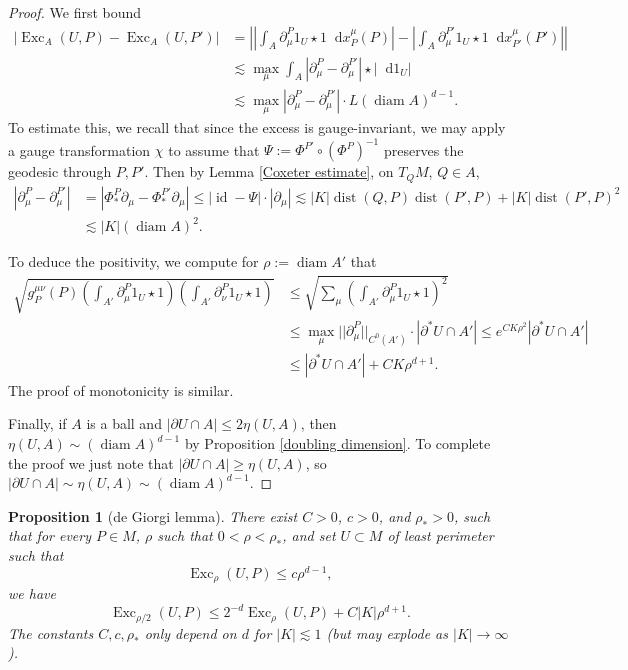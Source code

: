 \documentclass[reqno,10pt]{amsart}
\DeclareMathOperator{\diam}{diam}
\DeclareMathOperator{\Exc}{Exc}
\DeclareMathOperator{\id}{id}
\newcommand*\dif{\mathop{}\!\mathrm{d}}
\DeclareMathOperator{\dist}{dist}
\newtheorem{proposition}[theorem]{Proposition}
\theoremstyle{definition}
\numberwithin{equation}{section}
\begin{document}
\begin{proof}
We first bound
\begin{align*}
|\Exc_A(U, P) - \Exc_A(U, P')| &= \left|\left|\int_A \partial^P_\mu 1_U \star 1 \dif x^\mu_P(P)\right| - \left|\int_A \partial^{P'}_\mu 1_U \star 1 \dif x^\mu_{P'}(P')\right|\right| \\
&\lesssim \max_\mu \int_A |\partial^P_\mu - \partial^{P'}_\mu| \star |\dif 1_U| \\
&\lesssim \max_\mu |\partial^P_\mu - \partial^{P'}_\mu| \cdot L(\diam A)^{d - 1}.
\end{align*}
To estimate this, we recall that since the excess is gauge-invariant, we may apply a gauge transformation $\chi$ to assume that $\Psi := \Phi^{P'} \circ (\Phi^P)^{-1}$ preserves the geodesic through $P, P'$.
Then by Lemma \ref{Coxeter estimate}, on $T_QM$, $Q \in A$,
\begin{align*}
|\partial^P_\mu - \partial^{P'}_\mu| &= |\Phi^P_* \partial_\mu - \Phi^{P'}_* \partial_\mu| \leq |\id - \Psi| \cdot |\partial_\mu|
\lesssim |K| \dist(Q, P) \dist(P', P) + |K| \dist(P', P)^2 \\
&\lesssim |K| (\diam A)^2.
\end{align*}

To deduce the positivity, we compute for $\rho := \diam A'$ that
\begin{align*}
\sqrt{g^{\mu\nu}_P(P) \left(\int_{A'} \partial^P_\mu 1_U \star 1\right) \left(\int_{A'} \partial^P_\nu 1_U \star 1\right)} &\leq \sqrt{\sum_\mu \left(\int_{A'} \partial_\mu^P 1_U \star 1\right)^2} \\
 & \leq \max_\mu ||\partial^P_\mu||_{C^0(A')} \cdot |\partial^* U \cap A'| \leq e^{CK\rho^2} |\partial^* U \cap A'| \\
 & \leq |\partial^* U \cap A'| + CK\rho^{d + 1}.
\end{align*}
The proof of monotonicity is similar.

Finally, if $A$ is a ball and $|\partial U \cap A| \leq 2\eta(U, A)$, then $\eta(U, A) \sim (\diam A)^{d - 1}$ by Proposition \ref{doubling dimension}.
To complete the proof we just note that $|\partial U \cap A| \geq \eta(U, A)$, so $|\partial U \cap A| \sim \eta(U, A) \sim (\diam A)^{d - 1}$.
\end{proof}

\begin{proposition}[de Giorgi lemma]\label{de Giorgi}
There exist $C > 0$, $c > 0$, and $\rho_* > 0$, such that for every $P \in M$, $\rho$ such that $0 < \rho < \rho_*$, and set $U \subset M$ of least perimeter such that 
$$\Exc_\rho(U, P) \leq c\rho^{d - 1},$$
we have 
$$\Exc_{\rho/2}(U, P) \leq 2^{-d} \Exc_\rho(U, P) + C|K|\rho^{d + 1}.$$
The constants $C, c, \rho_*$ only depend on $d$ for $|K| \lesssim 1$ (but may explode as $|K| \to \infty$).
\end{proposition}
\end{document}
